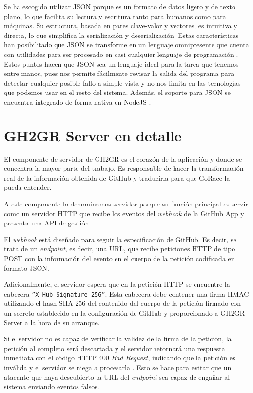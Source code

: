 Se ha escogido utilizar \acrshort{JSON} porque es un formato de datos ligero y de texto plano, lo que facilita su lectura y escritura tanto para humanos como para máquinas. Su estructura, basada en pares clave-valor y vectores, es intuitiva y directa, lo que simplifica la serialización y deserialización. Estas características han posibilitado que \acrshort{JSON} se transforme en un lenguaje omnipresente que cuenta con utilidades para ser procesado en casi cualquier lenguaje de programación \cite{jsonJSON}. Estos puntos hacen que \acrshort{JSON} sea un lenguaje ideal para la tarea que tenemos entre manos, pues nos permite fácilmente revisar la salida del programa para detectar cualquier posible fallo a simple vista y no nos limita en las tecnologías que podemos usar en el resto del sistema. Además, el soporte para \acrshort{JSON} se encuentra integrado de forma nativa en NodeJS \cite{ecma262}.

\section{GH2GR Server en detalle}
El componente de servidor de GH2GR es el corazón de la aplicación y donde se concentra la mayor parte del trabajo. Es responsable de hacer la transformación real de la información obtenida de GitHub y traducirla para que GoRace la pueda entender.

A este componente lo denominamos servidor porque su función principal es servir como un servidor \acrshort{HTTP} que recibe los eventos del \textit{webhook} de la GitHub App y presenta una \acrshort{API} de gestión.

El \textit{webhook} está diseñado para seguir la especificación de GitHub. Es decir, se trata de un \textit{endpoint}, es decir, una \acrshort{URL}, que recibe peticiones \acrshort{HTTP} de tipo POST con la información del evento en el cuerpo de la petición codificada en formato \acrshort{JSON}. 

Adicionalmente, el servidor espera que en la petición \acrshort{HTTP} se encuentre la cabecera {\tt ''X-Hub-Signature-256''}. Esta cabecera debe contener una firma \acrshort{HMAC}\cite{rfc2104} utilizando el hash SHA-256\cite{Dang2015} del contenido del cuerpo de la petición firmado con un secreto establecido en la configuración de GitHub y proporcionado a GH2GR Server a la hora de su arranque. 

Si el servidor no es capaz de verificar la validez de la firma de la petición, la petición al completo será descartada y el servidor retornará una respuesta inmediata con el código \acrshort{HTTP} 400 \textit{Bad Request}, indicando que la petición es inválida y el servidor se niega a procesarla \cite{rfc7231}. Esto se hace para evitar que un atacante que haya descubierto la \acrshort{URL} del \textit{endpoint} sea capaz de engañar al sistema enviando eventos falsos.

